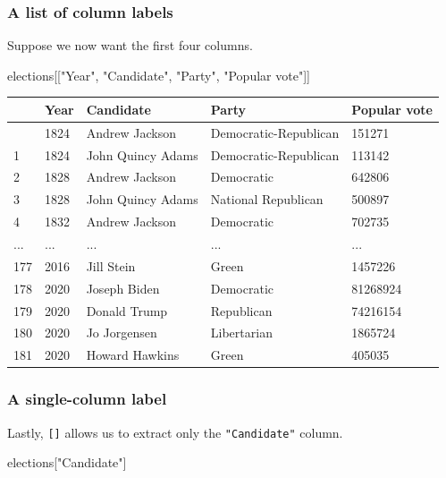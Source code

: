 \documentclass[
  letterpaper,
  DIV=11,
  numbers=noendperiod]{scrreprt}
\newenvironment{Shaded}{\begin{snugshade}}{\end{snugshade}}
\newcommand{\NormalTok}[1]{\textcolor[rgb]{0.00,0.23,0.31}{#1}}
\newcommand{\StringTok}[1]{\textcolor[rgb]{0.13,0.47,0.30}{#1}}
\begin{document}
\subsubsection{A list of column labels}\label{a-list-of-column-labels}

Suppose we now want the first four columns.

\begin{Shaded}
\begin{Highlighting}[]
\NormalTok{elections[[}\StringTok{"Year"}\NormalTok{, }\StringTok{"Candidate"}\NormalTok{, }\StringTok{"Party"}\NormalTok{, }\StringTok{"Popular vote"}\NormalTok{]]}
\end{Highlighting}
\end{Shaded}

\begin{longtable}[]{@{}lllll@{}}
\toprule\noalign{}
& Year & Candidate & Party & Popular vote \\
\midrule\noalign{}
\endhead
\bottomrule\noalign{}
\endlastfoot
0 & 1824 & Andrew Jackson & Democratic-Republican & 151271 \\
1 & 1824 & John Quincy Adams & Democratic-Republican & 113142 \\
2 & 1828 & Andrew Jackson & Democratic & 642806 \\
3 & 1828 & John Quincy Adams & National Republican & 500897 \\
4 & 1832 & Andrew Jackson & Democratic & 702735 \\
... & ... & ... & ... & ... \\
177 & 2016 & Jill Stein & Green & 1457226 \\
178 & 2020 & Joseph Biden & Democratic & 81268924 \\
179 & 2020 & Donald Trump & Republican & 74216154 \\
180 & 2020 & Jo Jorgensen & Libertarian & 1865724 \\
181 & 2020 & Howard Hawkins & Green & 405035 \\
\end{longtable}

\subsubsection{A single-column label}\label{a-single-column-label}

Lastly, \texttt{{[}{]}} allows us to extract only the
\texttt{"Candidate"} column.

\begin{Shaded}
\begin{Highlighting}[]
\NormalTok{elections[}\StringTok{"Candidate"}\NormalTok{]}
\end{Highlighting}
\end{Shaded}
\end{document}
